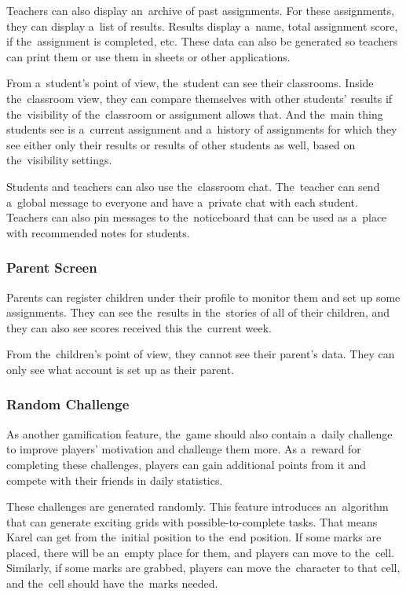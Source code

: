 Teachers can also display an~archive of past assignments.
For these assignments, they can display a~list of results.
Results display a~name, total assignment score, if the~assignment is completed, etc.
These data can also be generated so teachers can print them or use them in sheets or other applications.

From a~student's point of view, the~student can see their classrooms.
Inside the~classroom view, they can compare themselves with other students' results if the~visibility of the~classroom or assignment allows that.
And the~main thing students see is a~current assignment and a~history of assignments for which they see either only their results or results of other students as well, based on the~visibility settings.

Students and teachers can also use the~classroom chat.
The~teacher can send a~global message to everyone and have a~private chat with each student.
Teachers can also pin messages to the~noticeboard that can be used as a~place with recommended notes for students.

\subsubsection{Parent Screen}

Parents can register children under their profile to monitor them and set up some assignments.
They can see the~results in the~stories of all of their children, and they can also see scores received this the~current week.

From the~children's point of view, they cannot see their parent's data.
They can only see what account is set up as their parent.

\subsubsection{Random Challenge}

As another gamification feature, the~game should also contain a~daily challenge to improve players' motivation and challenge them more. 
As a~reward for completing these challenges, players can gain additional points from it and compete with their friends in daily statistics.

These challenges are generated randomly.
This feature introduces an~algorithm that can generate exciting grids with possible-to-complete tasks.
That means Karel can get from the~initial position to the~end position.
If some marks are placed, there will be an~empty place for them, and players can move to the~cell.
Similarly, if some marks are grabbed, players can move the~character to that cell, and the~cell should have the~marks needed.

